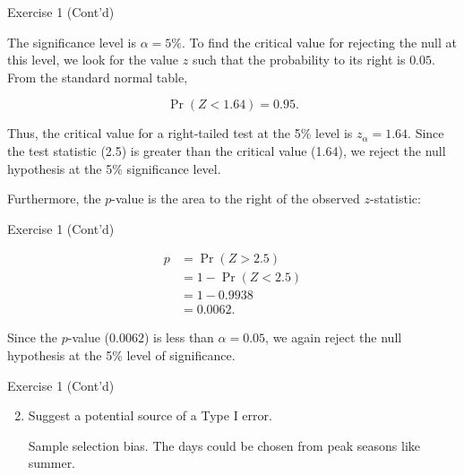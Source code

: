 \documentclass[
  ignorenonframetext,
  aspectratio=43,
]{beamer}
\let\olditem\item
\renewcommand\item{\olditem\justifying}
\begin{document}
\begin{frame}{Exercise 1 (Cont'd)}
\protect\hypertarget{exercise-1-contd-1}{}
\pause

The significance level is \(\alpha = 5\%\). To find the critical value
for rejecting the null at this level, we look for the value \(z\) such
that the probability to its right is \(0.05\). From the standard normal
table, \vspace{-4pt}

\pause

\[
\Pr(Z < 1.64) = 0.95.
\]

\pause

Thus, the critical value for a right-tailed test at the 5\% level is
\(z_{\alpha} = 1.64\). Since the test statistic (2.5) is greater than
the critical value (1.64), we reject the null hypothesis at the 5\%
significance level.

\pause

Furthermore, the \(p\)-value is the area to the right of the observed
\(z\)-statistic:
\end{frame}

\begin{frame}{Exercise 1 (Cont'd)}
\protect\hypertarget{exercise-1-contd-2}{}
\pause

\[
\begin{aligned}
p &= \Pr(Z > 2.5) \\
  &= 1 - \Pr(Z < 2.5) \\
  &= 1 - 0.9938 \\
  &= 0.0062.
\end{aligned}
\]

\pause

Since the \(p\)-value (\(0.0062\)) is less than \(\alpha = 0.05\), we
again reject the null hypothesis at the 5\% level of significance.
\end{frame}

\begin{frame}{Exercise 1 (Cont'd)}
\protect\hypertarget{exercise-1-contd-3}{}
\begin{enumerate}
\setcounter{enumi}{1}
\item
  Suggest a potential source of a Type I error.

  \pause

  Sample selection bias. The days could be chosen from peak seasons like
  summer.
\end{enumerate}
\end{frame}
\end{document}
